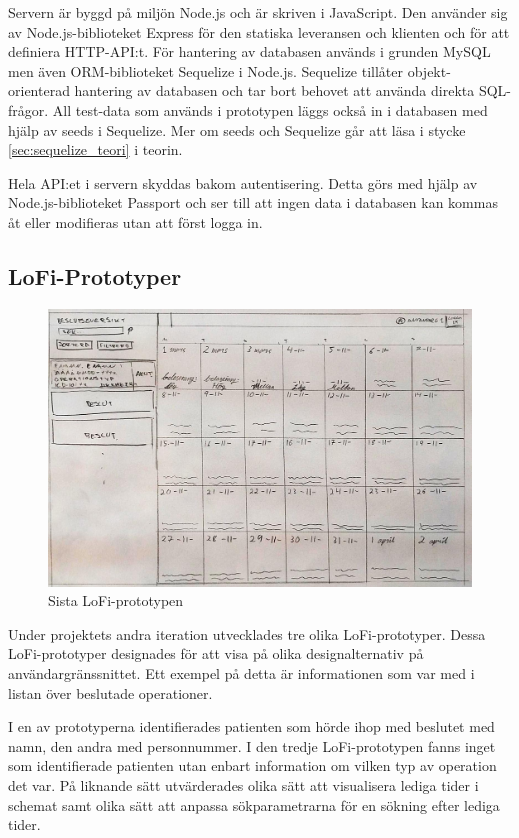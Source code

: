 Servern är byggd på miljön Node.js och är skriven i JavaScript. Den använder sig av Node.js-biblioteket Express för den statiska leveransen och klienten och för att definiera HTTP-API:t. För hantering av databasen används i grunden MySQL men även ORM-biblioteket Sequelize i Node.js. Sequelize tillåter objekt-orienterad hantering av databasen och tar bort behovet att använda direkta SQL-frågor. All test-data som används i prototypen läggs också in i databasen med hjälp av seeds i Sequelize. Mer om seeds och Sequelize går att läsa i stycke \ref{sec:sequelize_teori} i teorin.

Hela API:et i servern skyddas bakom autentisering. Detta görs med hjälp av Node.js-biblioteket Passport och ser till att ingen data i databasen kan kommas åt eller modifieras utan att först logga in.

\subsection{LoFi-Prototyper}

\begin{figure}[H]
  \includegraphics[width=\linewidth]{Figures/LoFi_no2.jpg}
  \caption{Sista LoFi-prototypen}
  \label{fig:LofiPic}
\end{figure}


Under projektets andra iteration utvecklades tre olika LoFi-prototyper. Dessa
LoFi-prototyper designades för att visa på olika designalternativ på
användargränssnittet. Ett exempel på detta är informationen som var med i listan
över beslutade operationer.

I en av prototyperna identifierades patienten som hörde ihop med beslutet med namn, den andra med personnummer. I den tredje LoFi-prototypen
fanns inget som identifierade patienten utan enbart information om vilken
typ av operation det var. På liknande sätt utvärderades olika sätt att
visualisera lediga tider i schemat samt olika sätt att anpassa sökparametrarna för en sökning efter lediga tider.

